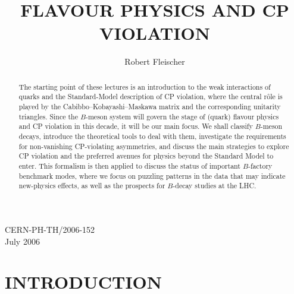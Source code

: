 \documentclass[12pt]{article}
\begin{document}
\vfill
\noindent
CERN-PH-TH/2006-152\\
July 2006

\newpage
\thispagestyle{empty}
\vbox{}
\newpage
 
\setcounter{page}{1}



\pagestyle{plain}

\setcounter{page}{1}

\tableofcontents

\newpage

\setcounter{page}{1}



\title{FLAVOUR PHYSICS AND CP VIOLATION}
\author{Robert Fleischer}
\maketitle
\begin{abstract}
The starting point of these lectures is an introduction to the weak 
interactions of quarks and the Standard-Model description of CP violation, 
where the central r\^ole is played by the Cabibbo--Kobayashi--Maskawa matrix 
and the corresponding unitarity triangles. Since the $B$-meson system will govern 
the stage of (quark) flavour physics and CP violation in this decade, 
it will be our main focus. We  shall classify $B$-meson decays, introduce the 
theoretical tools to deal with them, investigate the requirements for non-vanishing 
CP-violating asymmetries, and discuss the main strategies to explore
CP violation and the preferred avenues for physics beyond the Standard Model
to enter. This formalism is then applied to discuss the status of important 
$B$-factory benchmark modes, where we focus on puzzling patterns in the
data that may indicate new-physics effects, as well as the prospects for 
$B$-decay studies at the LHC.
\end{abstract}



\pagestyle{plain}




\pagestyle{plain}


%
%
%
\section{INTRODUCTION}\label{sec:intro}
\setcounter{equation}{0}
%
%
\end{document}
